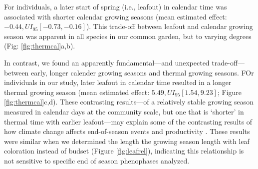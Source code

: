 \documentclass{article}[12pt]
\begin{document}
For individuals, a later start of spring (i.e., leafout) in calendar time was associated with shorter calendar growing seasons (mean estimated effect: $-0.44, UI_{95}[-0.73, -0.16]$). This trade-off between leafout and calendar growing season was apparent in all species in our common garden, but to varying degrees (Fig: \ref{fig:thermcal}a,b). %

In contrast, we found an apparently fundamental---and unexpected trade-off---between early, longer calender growing seasons and thermal growing seasons. FOr individuals in our study, later leafout in calendar time resulted in a longer thermal growing season (mean estimated effect: $5.49, UI_{95}[1.54, 9.23]$; Figure \ref{fig:thermcal}c,d). These contrasting results---of a relatively stable growing season measured in calendar days at the community scale, but one that is `shorter' in thermal time with earlier leafout---may explain some of the contrasting results of how climate change affects end-of-season events and productivity \citep{Zani2020}. These results were similar when we determined the length the growing season length with leaf coloration instead of budset (Figure \ref{fig:leafrel}), indicating this relationship is not sensitive to specific end of season phenophases analyzed. 
\end{document}
